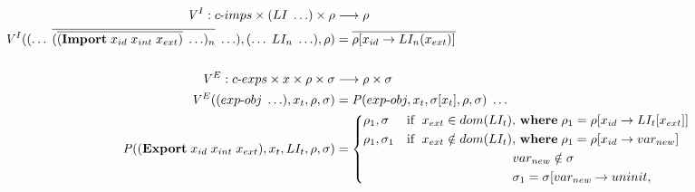 \documentclass[sigplan,screen,anonymous]{acmart}
\def\dash {\text{-}}
\begin{document}
\newcommand{\runio}[1]{run\dash prog(#1, \rho, \sigma)\;}
\newcommand{\prog}[2]{(\textbf{program}\; (\textbf{use\dash linklets}\;#1 )\;#2)}
\def\transrel {&\twoheadrightarrow_{p}\;}

\begin{figure*}[tbp]
  \begin{align*}
    \mathit{V}^I : c\dash imps \times (LI\;\ldots) \times \rho &\longrightarrow \rho \\
    \mathit{V}^I((\ldots\;\overline{(\overline{(\textbf{Import}\; x_{id}\;x_{int}\;x_{ext})}\;\ldots)_n}\;\ldots), (\ldots\;LI_n\;\ldots), \rho) &= \overline{\rho[x_{id}\rightarrow LI_n(x_{ext})]}\\ \\
    \mathit{V}^E : c\dash exps \times x \times \rho \times \sigma &\longrightarrow \rho \times \sigma \\
    \mathit{V}^E((exp\dash obj\;\ldots), x_t, \rho, \sigma) &= \mathit{P}(exp\dash obj, x_t, \sigma[x_t], \rho, \sigma)\;\ldots\\
    \mathit{P}((\textbf{Export}\;x_{id}\;x_{int}\;x_{ext}), x_t, LI_t, \rho, \sigma) &= \begin{cases*}
      \rho_1, \sigma & if $\;x_{ext} \in dom(LI_t)$, \where $\rho_1 = \rho[x_{id}\rightarrow LI_t[x_{ext}]]$ \\
      \rho_1, \sigma_1 & if $\;x_{ext} \notin dom(LI_t)$, \where $\rho_1 = \rho[x_{id}\rightarrow var_{new}]$\\
      \;        &\; \hspace{2.6cm} $var_{new} \notin \sigma$ \\
      \;        &\; \hspace{2.6cm} $\sigma_1 = \sigma[var_{new}\rightarrow uninit,$ \\

\end{cases*}
\end{align*}
\end{figure*}
\end{document}
